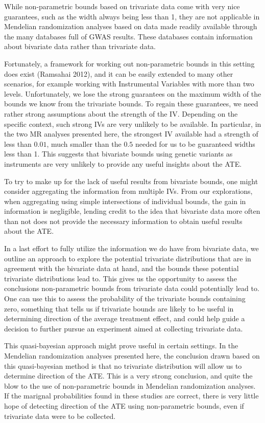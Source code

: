 \documentclass[
]{article}
\theoremstyle{plain}
\begin{document}
While non-parametric bounds based on trivariate data come with very nice guarantees, such as the width always being less than 1, they are not applicable in Mendelian randomization analyses based on data made readily available through the many databases full of GWAS results. These databases contain information about bivariate data rather than trivariate data.

Fortunately, a framework for working out non-parametric bounds in this setting does exist (Ramsahai 2012), and it can be easily extended to many other scenarios, for example working with Instrumental Variables with more than two levels. Unfortunately, we lose the strong guarantees on the maximum width of the bounds we know from the trivariate bounds. To regain these guarantees, we need rather strong assumptions about the strength of the IV. Depending on the specific context, such strong IVs are very unlikely to be available. In particular, in the two MR analyses presented here, the strongest IV available had a strength of less than \(0.01\), much smaller than the \(0.5\) needed for us to be guaranteed widths less than 1. This suggests that bivariate bounds using genetic variants as instruments are very unlikely to provide any useful insights about the ATE.

To try to make up for the lack of useful results from bivariate bounds, one might consider aggregating the information from multiple IVs. From our explorations, when aggregating using simple intersections of individual bounds, the gain in information is negligible, lending credit to the idea that bivariate data more often than not does not provide the necessary information to obtain useful results about the ATE.

In a last effort to fully utilize the information we do have from bivariate data, we outline an approach to explore the potential trivariate distributions that are in agreement with the bivariate data at hand, and the bounds these potential trivariate distributions lead to. This gives us the opportunity to assess the conclusions non-parametric bounds from trivariate data could potentially lead to. One can use this to assess the probability of the trivariate bounds containing zero, something that tells us if trivariate bounds are likely to be useful in determining direction of the average treatment effect, and could help guide a decision to further pursue an experiment aimed at collecting trivariate data.

This quasi-bayesian approach might prove useful in certain settings. In the Mendelian randomization analyses presented here, the conclusion drawn based on this quasi-bayesian method is that no trivariate distribution will allow us to determine direction of the ATE. This is a very strong conclusion, and quite the blow to the use of non-parametric bounds in Mendelian randomization analyses. If the marignal probabilities found in these studies are correct, there is very little hope of detecting direction of the ATE using non-parametric bounds, even if trivariate data were to be collected.
\end{document}

